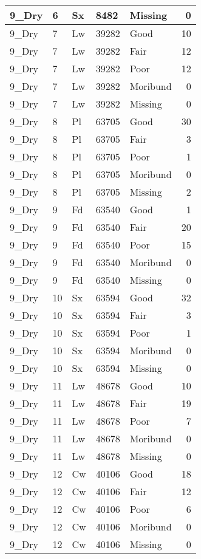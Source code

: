 \documentclass[
]{article}
\begin{document}
\begin{tabular}{l|l|l|l|l|r}
\hline
9\_Dry & 6 & Sx & 8482 & Missing & 0\\
\hline
9\_Dry & 7 & Lw & 39282 & Good & 10\\
\hline
9\_Dry & 7 & Lw & 39282 & Fair & 12\\
\hline
9\_Dry & 7 & Lw & 39282 & Poor & 12\\
\hline
9\_Dry & 7 & Lw & 39282 & Moribund & 0\\
\hline
9\_Dry & 7 & Lw & 39282 & Missing & 0\\
\hline
9\_Dry & 8 & Pl & 63705 & Good & 30\\
\hline
9\_Dry & 8 & Pl & 63705 & Fair & 3\\
\hline
9\_Dry & 8 & Pl & 63705 & Poor & 1\\
\hline
9\_Dry & 8 & Pl & 63705 & Moribund & 0\\
\hline
9\_Dry & 8 & Pl & 63705 & Missing & 2\\
\hline
9\_Dry & 9 & Fd & 63540 & Good & 1\\
\hline
9\_Dry & 9 & Fd & 63540 & Fair & 20\\
\hline
9\_Dry & 9 & Fd & 63540 & Poor & 15\\
\hline
9\_Dry & 9 & Fd & 63540 & Moribund & 0\\
\hline
9\_Dry & 9 & Fd & 63540 & Missing & 0\\
\hline
9\_Dry & 10 & Sx & 63594 & Good & 32\\
\hline
9\_Dry & 10 & Sx & 63594 & Fair & 3\\
\hline
9\_Dry & 10 & Sx & 63594 & Poor & 1\\
\hline
9\_Dry & 10 & Sx & 63594 & Moribund & 0\\
\hline
9\_Dry & 10 & Sx & 63594 & Missing & 0\\
\hline
9\_Dry & 11 & Lw & 48678 & Good & 10\\
\hline
9\_Dry & 11 & Lw & 48678 & Fair & 19\\
\hline
9\_Dry & 11 & Lw & 48678 & Poor & 7\\
\hline
9\_Dry & 11 & Lw & 48678 & Moribund & 0\\
\hline
9\_Dry & 11 & Lw & 48678 & Missing & 0\\
\hline
9\_Dry & 12 & Cw & 40106 & Good & 18\\
\hline
9\_Dry & 12 & Cw & 40106 & Fair & 12\\
\hline
9\_Dry & 12 & Cw & 40106 & Poor & 6\\
\hline
9\_Dry & 12 & Cw & 40106 & Moribund & 0\\
\hline
9\_Dry & 12 & Cw & 40106 & Missing & 0\\

\end{tabular}
\end{document}
